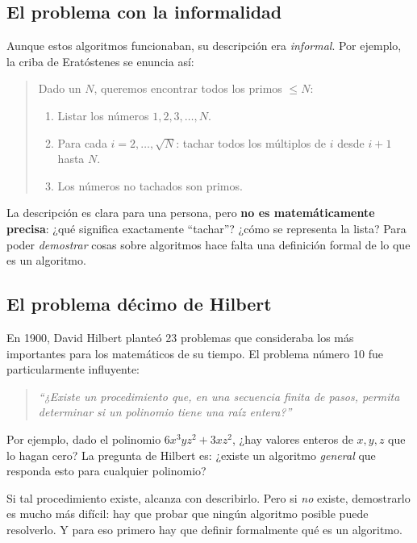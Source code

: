 \documentclass[11pt,a4paper]{article}
\theoremstyle{definicion}
\begin{document}
\subsection{El problema con la informalidad}

Aunque estos algoritmos funcionaban, su descripción era \emph{informal}. Por ejemplo, la criba de Eratóstenes se enuncia así:

\begin{quote}
Dado un $N$, queremos encontrar todos los primos $\leq N$:
\begin{enumerate}
    \item Listar los números $1, 2, 3, \dots, N$.
    \item Para cada $i = 2, \dots, \sqrt{N}$: tachar todos los múltiplos de $i$ desde $i+1$ hasta $N$.
    \item Los números no tachados son primos.
\end{enumerate}
\end{quote}

La descripción es clara para una persona, pero \textbf{no es matemáticamente precisa}: ¿qué significa exactamente ``tachar''? ¿cómo se representa la lista? Para poder \emph{demostrar} cosas sobre algoritmos hace falta una definición formal de lo que es un algoritmo.

\subsection{El problema décimo de Hilbert}

En 1900, David Hilbert planteó 23 problemas que consideraba los más importantes para los matemáticos de su tiempo. El problema número 10 fue particularmente influyente:

\begin{quote}
\emph{``¿Existe un procedimiento que, en una secuencia finita de pasos, permita determinar si un polinomio tiene una raíz entera?''}
\end{quote}

Por ejemplo, dado el polinomio $6x^3 y z^2 + 3 x z^2$, ¿hay valores enteros de $x, y, z$ que lo hagan cero? La pregunta de Hilbert es: ¿existe un algoritmo \emph{general} que responda esto para cualquier polinomio?

\begin{idea}
Si tal procedimiento existe, alcanza con describirlo. Pero si \emph{no} existe, demostrarlo es mucho más difícil: hay que probar que ningún algoritmo posible puede resolverlo. Y para eso primero hay que definir formalmente qué es un algoritmo.
\end{idea}
\end{document}
